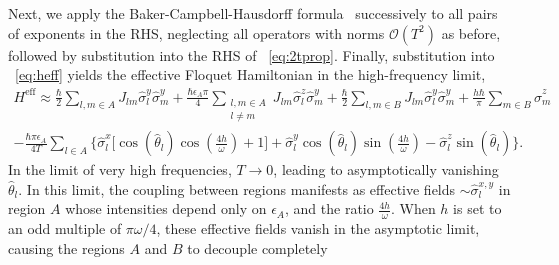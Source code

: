 \documentclass[12pt]{iopart}
\providecommand{\DIFaddtex}[1]{{\protect\color{red}\uwave{#1}}} %
\providecommand{\DIFdeltex}[1]{{}}                      %
\providecommand{\DIFaddbegin}{} %
\providecommand{\DIFaddend}{} %
\providecommand{\DIFdelbegin}{} %
\providecommand{\DIFdelend}{} %
\providecommand{\DIFadd}[1]{\texorpdfstring{\DIFaddtex{#1}}{#1}} %
\providecommand{\DIFdel}[1]{\texorpdfstring{\DIFdeltex{#1}}{}} %
\newcommand{\DIFscaledelfig}{0.5}
\newlength{\DIFdelgraphicswidth} %
\newlength{\DIFdelgraphicsheight} %
\newcommand{\DIFaddincludegraphics}[2][]{{\color{blue}\fbox{\DIFOincludegraphics[#1]{#2}}}} %
\newcommand{\DIFdelincludegraphics}[2][]{%
\sbox{\DIFdelgraphicsbox}{\DIFOincludegraphics[#1]{#2}}%
\settoboxwidth{\DIFdelgraphicswidth}{\DIFdelgraphicsbox} %
\settoboxtotalheight{\DIFdelgraphicsheight}{\DIFdelgraphicsbox} %
\scalebox{\DIFscaledelfig}{%
\parbox[b]{\DIFdelgraphicswidth}{\usebox{\DIFdelgraphicsbox}\\[-\baselineskip] \rule{\DIFdelgraphicswidth}{0em}}\llap{\resizebox{\DIFdelgraphicswidth}{\DIFdelgraphicsheight}{%
\setlength{\unitlength}{\DIFdelgraphicswidth}%
\begin{picture}(1,1)%
\thicklines\linethickness{2pt} %
{\color[rgb]{1,0,0}\put(0,0){\framebox(1,1){}}}%
{\color[rgb]{1,0,0}\put(0,0){\line( 1,1){1}}}%
{\color[rgb]{1,0,0}\put(0,1){\line(1,-1){1}}}%
\end{picture}%
}\hspace*{3pt}}} %
} %
\DeclareRobustCommand{\DIFaddbegin}{\DIFOaddbegin \let\includegraphics\DIFaddincludegraphics} %
\DeclareRobustCommand{\DIFaddend}{\DIFOaddend \let\includegraphics\DIFOincludegraphics} %
\DeclareRobustCommand{\DIFdelbegin}{\DIFOdelbegin \let\includegraphics\DIFdelincludegraphics} %
\DeclareRobustCommand{\DIFdelend}{\DIFOaddend \let\includegraphics\DIFOincludegraphics} %
\begin{document}
Next, we apply the Baker-Campbell-Hausdorff formula~\cite{Magnus1954} successively to all pairs of exponents in the RHS, neglecting all operators with norms $\mathcal{O}(T^2)$ as before, followed by substitution into the RHS of \DIFdelbegin \DIFdel{Eqn.}\DIFdelend \DIFaddbegin \DIFadd{equation}\DIFaddend ~\ref{eq:2tprop}. Finally, substitution into \DIFdelbegin \DIFdel{Eqn.}\DIFdelend \DIFaddbegin \DIFadd{equation}\DIFaddend ~\ref{eq:heff} yields the effective Floquet Hamiltonian in the high-frequency limit, 
\begin{multline}
    H^{\mathrm{eff}} \approx\frac{\hbar}{2} \sum_{l,m\in A}J_{lm}\hat{\sigma}_l^y\hat{\sigma}_m^y +\frac{\hbar \epsilon_A \pi}{4} \sum_{\substack{l,m\in A\\l\neq m}} J_{lm}\hat{\sigma}^z_l\hat{\sigma}^y_m + \frac{\hbar}{2}\sum_{l,m\in B}J_{lm}\hat{\sigma}_l^y \hat{\sigma}_m^y + \frac{h\hbar}{\pi}\sum_{m \in B}\hat{\sigma}^z_m \\ -\frac{\hbar \pi \epsilon_A}{4T}\sum_{l\in A}\Bigg\{\hat{\sigma}^x_l \bigg[\cos(\hat{\theta}_l)\cos(\frac{4h}{\omega})+1 \bigg] + \hat{\sigma}^y_l \cos(\hat{\theta}_l)\sin(\frac{4h}{\omega})-\hat{\sigma}^z_l \sin(\hat{\theta}_l)\Bigg\}.
    \label{eq:app:nfloq_eff3}
\end{multline}
In the limit of very high frequencies, $T\rightarrow 0$, leading to asymptotically vanishing $\hat{\theta}_l$. In this limit, the coupling between regions manifests as effective fields $\sim \hat{\sigma}^{x,y}_l$ in region $A$ whose intensities depend only on $\epsilon_A$, and the ratio $\frac{4h}{\omega}$. When $h$ is set to an odd multiple of $\pi\omega/4$, these effective fields vanish in the asymptotic limit, causing the regions $A$ and $B$ to decouple completely\DIFaddbegin \DIFadd{.
}
\end{document}
